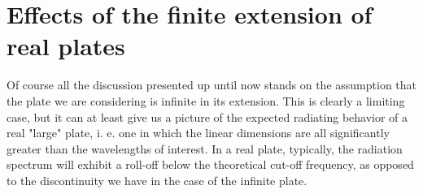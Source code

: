 \documentclass[a4paper]{article}
\begin{document}
\section{Effects of the finite extension of real plates}

Of course all the discussion presented up until now stands on the assumption that the plate we are considering is infinite in its extension. This is clearly a limiting case, but it can at least give us a picture of the expected radiating behavior of a real "large" plate, i. e. one in which the linear dimensions are all significantly greater than the wavelengths of interest. In a real plate, typically, the radiation spectrum will exhibit a roll-off below the theoretical cut-off frequency, as opposed to the discontinuity we have in the case of the infinite plate.

\printbibliography
\end{document}
